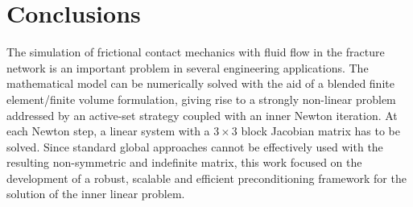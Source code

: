 \documentclass[3p,times]{elsarticle}
\theoremstyle{plain}
\begin{document}
\section{Conclusions}
\label{sec:concl}

The simulation of frictional contact mechanics with fluid flow in the fracture network is an important problem in several engineering applications.
The mathematical model can be numerically solved with the aid of a blended finite element/finite volume formulation, giving rise to a strongly non-linear problem addressed by an active-set strategy coupled with an inner Newton iteration.
At each Newton step, a linear system with a $3\times3$ block Jacobian matrix has to be solved.
Since standard global approaches cannot be effectively used with the resulting non-symmetric and indefinite matrix,
this work focused on the development of a robust, scalable and efficient preconditioning framework for the solution of the inner linear problem.

\end{document}
